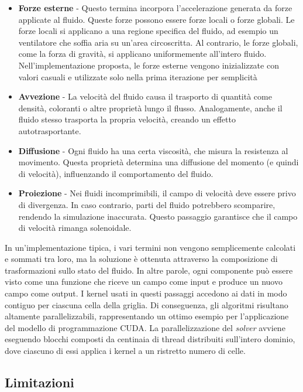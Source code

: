 \documentclass[12pt,a4paper,openany,twoside]{article}
\begin{document}
\begin{itemize}
    \item \textbf{Forze esterne} - Questo termina incorpora l'accelerazione generata da forze applicate al fluido. Queste forze possono essere forze locali o forze globali. Le forze locali si applicano a una regione specifica del fluido, ad esempio un ventilatore che soffia aria su un'area circoscritta. Al contrario, le forze globali, come la forza di gravità, si applicano uniformemente all'intero fluido. Nell'implementazione proposta, le forze esterne vengono inizializzate con valori casuali e utilizzate solo nella prima iterazione per semplicità
    \item \textbf{Avvezione} - La velocità del fluido causa il trasporto di quantità come densità, coloranti o altre proprietà lungo il flusso. Analogamente, anche il fluido stesso trasporta la propria velocità, creando un effetto autotrasportante.
    \item \textbf{Diffusione} - Ogni fluido ha una certa viscosità, che misura la resistenza al movimento. Questa proprietà determina una diffusione del momento (e quindi di velocità), influenzando il comportamento del fluido.
    \item \textbf{Proiezione} - Nei fluidi incomprimibili, il campo di velocità deve essere privo di divergenza. In caso contrario, parti del fluido potrebbero scomparire, rendendo la simulazione inaccurata. Questo passaggio garantisce che il campo di velocità rimanga solenoidale.
\end{itemize}
In un'implementazione tipica, i vari termini non vengono semplicemente calcolati e sommati tra loro, ma la soluzione è ottenuta attraverso la composizione di trasformazioni sullo stato del fluido. In altre parole, ogni componente può essere visto come una funzione che riceve un campo come input e produce un nuovo campo come output.
\newline
\newline
I kernel usati in questi passaggi accedono ai dati in modo contiguo per ciascuna cella della griglia. Di conseguenza, gli algoritmi risultano altamente parallelizzabili, rappresentando un ottimo esempio per l'applicazione del modello di programmazione CUDA. La parallelizzazione del \textit{solver} avviene eseguendo blocchi composti da centinaia di thread distribuiti sull'intero dominio, dove ciascuno di essi applica i kernel a un ristretto numero di celle.

\subsection{Limitazioni}
\end{document}
